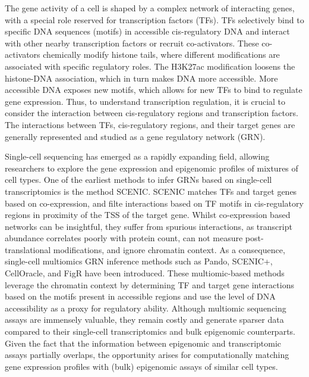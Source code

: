 The gene activity of a cell is shaped by a complex network of interacting genes, with a special role reserved for transcription factors (TFs). TFs selectively bind to specific DNA sequences (motifs) in accessible cis-regulatory DNA and interact with other nearby transcription factors or recruit co-activators\cite{Spitz2012}. These co-activators chemically modify histone tails, where different modifications are associated with specific regulatory roles. The H3K27ac modification loosens the histone-DNA association, which in turn makes DNA more accessible\cite{Creyghton2010}. More accessible DNA exposes new motifs, which allows for new TFs to bind to regulate gene expression\cite{Tsompana2014}. Thus, to understand transcription regulation, it is crucial to consider the interaction between cis-regulatory regions and transcription factors\cite{Xu_2020,Kamal_2021,Gonz_lez_Blas_2022,Fleck2022,Kamimoto2023,Kartha2022}. The interactions between TFs, cis-regulatory regions, and their target genes are generally represented and studied as a gene regulatory network (GRN).

Single-cell sequencing has emerged as a rapidly expanding field, allowing researchers to explore the gene expression and epigenomic profiles of mixtures of cell types. One of the earliest methods to infer GRNs based on single-cell transcriptomics is the method SCENIC\cite{Aibar_2017}. SCENIC matches TFs and target genes based on co-expression, and filte interactions based on TF motifs in cis-regulatory regions in proximity of the TSS of the target gene. Whilst co-expression based networks can be insightful, they suffer from spurious interactions, as transcript abundance correlates poorly with protein count\cite{Fortelny2017,Franks2017}, can not measure post-translational modifications, and ignore chromatin context. As a consequence, single-cell multiomics GRN inference methods such as Pando\cite{Fleck2022}, SCENIC+\cite{Gonz_lez_Blas_2022}, CellOracle\cite{Kamimoto2023}, and FigR\cite{Kartha2022} have been introduced. These multiomic-based methods leverage the chromatin context by determining TF and target gene interactions based on the motifs present in accessible regions and use the level of DNA accessibility as a proxy for regulatory ability. Although multiomic sequencing assays are immensely valuable, they remain costly and generate sparser data compared to their single-cell transcriptomics and bulk epigenomic counterparts\cite{Li2021}. Given the fact that the information between epigenomic and transcriptomic assays partially overlaps\cite{Wang2016,GonzlezRamrez2021}, the opportunity arises for computationally matching gene expression profiles with (bulk) epigenomic assays of similar cell types. 

